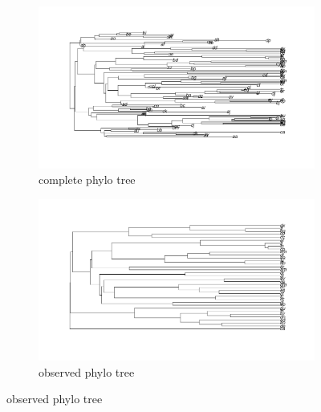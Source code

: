 \documentclass[10pt,a4paper]{article}
\begin{document}
\begin{figure}[t!]
\medskip
\begin{subfigure}{0.48\textwidth}
\includegraphics[width=\linewidth]{ph1.png}
\caption{complete phylo tree} \label{fig:e}
\end{subfigure}\hspace*{\fill}
\begin{subfigure}{0.48\textwidth}
\includegraphics[width=\linewidth]{ph2.png}
\caption{observed phylo tree} \label{fig:f}
\end{subfigure}

\end{figure}
\end{document}
